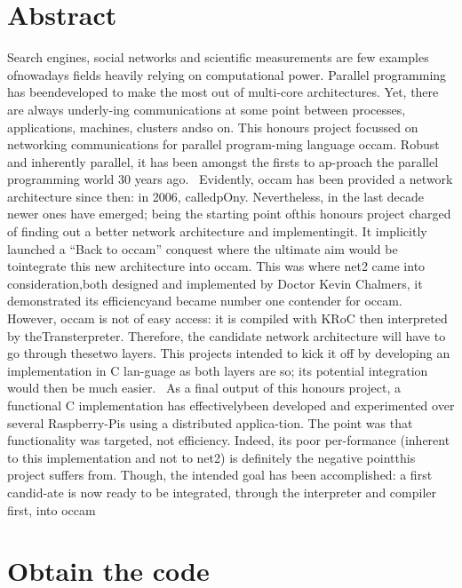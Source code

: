 \hypertarget{index_Abstract_section}{}\section{Abstract}\label{index_Abstract_section}
Search engines, social networks and scientific measurements are few examples ofnowadays fields heavily relying on computational power. Parallel programming has beendeveloped to make the most out of multi-\/core architectures. Yet, there are always underly-\/ing communications at some point between processes, applications, machines, clusters andso on. This honours project focussed on networking communications for parallel program-\/ming language occam. Robust and inherently parallel, it has been amongst the firsts to ap-\/proach the parallel programming world 30 years ago.~\newline
 Evidently, occam has been provided a network architecture since then\+: in 2006, calledp\+Ony. Nevertheless, in the last decade newer ones have emerged; being the starting point ofthis honours project charged of finding out a better network architecture and implementingit. It implicitly launched a “\+Back to occam” conquest where the ultimate aim would be tointegrate this new architecture into occam. This was where net2 came into consideration,both designed and implemented by Doctor Kevin Chalmers, it demonstrated its efficiencyand became number one contender for occam.~\newline
 However, occam is not of easy access\+: it is compiled with K\+Ro\+C then interpreted by the\+Transterpreter. Therefore, the candidate network architecture will have to go through thesetwo layers. This projects intended to kick it off by developing an implementation in C lan-\/guage as both layers are so; its potential integration would then be much easier.~\newline
 As a final output of this honours project, a functional C implementation has effectivelybeen developed and experimented over several Raspberry-\/\+Pis using a distributed applica-\/tion. The point was that functionality was targeted, not efficiency. Indeed, its poor per-\/formance (inherent to this implementation and not to net2) is definitely the negative pointthis project suffers from. Though, the intended goal has been accomplished\+: a first candid-\/ate is now ready to be integrated, through the interpreter and compiler first, into occam \hypertarget{index_Obtain_section}{}\section{Obtain the code}\label{index_Obtain_section}
